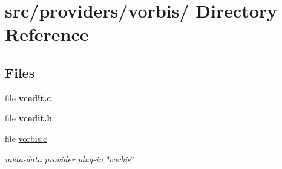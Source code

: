 \hypertarget{dir_000049}{
\section{src/providers/vorbis/ Directory Reference}
\label{dir_000049}
}
\subsection*{Files}
\begin{CompactItemize}
\item 
file {\bf vcedit.c}
\item 
file {\bf vcedit.h}
\item 
file \hyperlink{vorbis_8c}{vorbis.c}
\begin{CompactList}\small\item\em meta-data provider plug-in \char`\"{}vorbis\char`\"{} \item\end{CompactList}

\end{CompactItemize}
